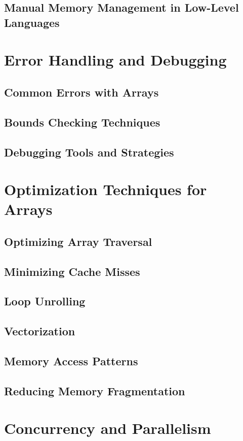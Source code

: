 \documentclass[12pt, oneside]{book}
\begin{document}
\section{Manual Memory Management in Low-Level Languages}

\chapter{Error Handling and Debugging}
\section{Common Errors with Arrays}
\section{Bounds Checking Techniques}
\section{Debugging Tools and Strategies}

\chapter{Optimization Techniques for Arrays}
\section{Optimizing Array Traversal}
\section{Minimizing Cache Misses}
\section{Loop Unrolling}
\section{Vectorization}
\section{Memory Access Patterns}
\section{Reducing Memory Fragmentation}

\chapter{Concurrency and Parallelism}
\end{document}
